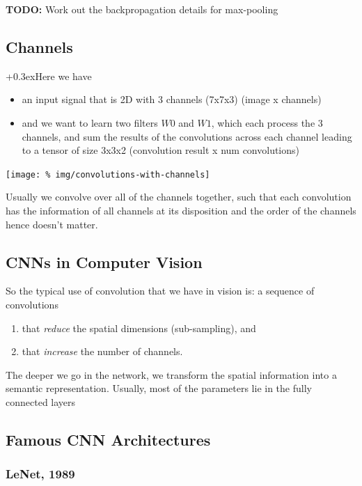 \documentclass[a2paper,8pt]{extarticle}
\newcommand{\todo}[1]{\textbf{TODO:} #1}
\newcommand{\todo}[1]{%
}
\newcommand{\customboxpaddingsize}{0pt}
\newcommand{\emptyarg}[1][]{\ifthenelse{\isempty{#1}}{}{\ (#1)}}
\newcommand{\Ex}[1][]{{\setlength\fboxsep{\customboxpaddingsize}
\colorbox{excolor}{%
\color{custtitlecolor}{\textbf{Ex.\emptyarg[#1]}}}\kern+0.3ex}}
\begin{document}
\begin{landscape}
\begin{multicols*}{7}
\todo{Work out the backpropagation details for max-pooling}

\subsection{Channels}

\Ex Here we have
\begin{itemize}
  \item an input signal that is 2D with 3 channels (7x7x3) (image x channels)
  \item and we want to learn two filters $W0$ and $W1$, which each process the 3
  channels, and sum the results of the convolutions across each channel leading
  to a tensor of size 3x3x2 (convolution result x num convolutions)
\end{itemize}

\begin{center}
  \texttt{[image: \%
img/convolutions-with-channels]}
\end{center}

Usually we convolve over all of the channels together, such that each
convolution has the information of all channels at its disposition and the
order of the channels hence doesn't matter.

\subsection{CNNs in Computer Vision}

So the typical use of convolution that we have in vision is: a sequence of
convolutions
\begin{enumerate}
  \item that \emph{reduce} the spatial dimensions (sub-sampling), and
  \item that \emph{increase} the number of channels.
\end{enumerate}
The deeper we go in the network, we transform the spatial information into a
semantic representation. Usually, most of the parameters lie in the fully
connected layers

\subsection{Famous CNN Architectures}

\subsubsection{LeNet, 1989}


\end{multicols*}
\end{landscape}
\end{document}
